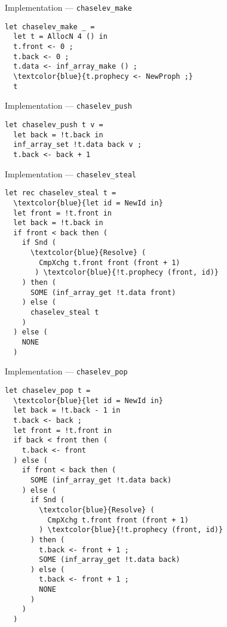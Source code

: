 \begin{frame}[fragile]{Implementation --- \texttt{chaselev\_make}}
\begin{Verbatim}[commandchars=\\\{\}]
let chaselev_make _ =
  let t = AllocN 4 () in
  t.front <- 0 ;
  t.back <- 0 ;
  t.data <- inf_array_make () ;
  \textcolor{blue}{t.prophecy <- NewProph ;}
  t
\end{Verbatim}
\end{frame}


\begin{frame}[fragile]{Implementation --- \texttt{chaselev\_push}}
\begin{Verbatim}[commandchars=\\\{\}]
let chaselev_push t v =
  let back = !t.back in
  inf_array_set !t.data back v ;
  t.back <- back + 1
\end{Verbatim}
\end{frame}


\begin{frame}[fragile]{Implementation --- \texttt{chaselev\_steal}}
\small
\begin{Verbatim}[commandchars=\\\{\}]
let rec chaselev_steal t =
  \textcolor{blue}{let id = NewId in}
  let front = !t.front in
  let back = !t.back in
  if front < back then (
    if Snd (
      \textcolor{blue}{Resolve} (
        CmpXchg t.front front (front + 1)
       ) \textcolor{blue}{!t.prophecy (front, id)}
    ) then (
      SOME (inf_array_get !t.data front)
    ) else (
      chaselev_steal t
    )
  ) else (
    NONE
  )
\end{Verbatim}
\end{frame}


\begin{frame}[fragile]{Implementation --- \texttt{chaselev\_pop}}
\footnotesize
\begin{Verbatim}[commandchars=\\\{\}]
let chaselev_pop t =
  \textcolor{blue}{let id = NewId in}
  let back = !t.back - 1 in
  t.back <- back ;
  let front = !t.front in
  if back < front then (
    t.back <- front
  ) else (
    if front < back then (
      SOME (inf_array_get !t.data back)
    ) else (
      if Snd (
        \textcolor{blue}{Resolve} (
          CmpXchg t.front front (front + 1)
        ) \textcolor{blue}{!t.prophecy (front, id)}
      ) then (
        t.back <- front + 1 ;
        SOME (inf_array_get !t.data back)
      ) else (
        t.back <- front + 1 ;
        NONE
      )
    )
  )
\end{Verbatim}
\end{frame}